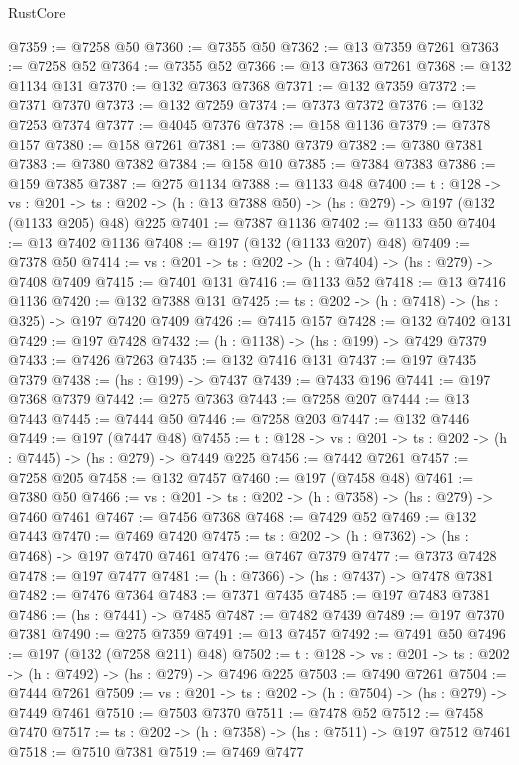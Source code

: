 \begin{lexlean}{RustCore}
\begin{coremodule}
@7359 := @7258 @50
@7360 := @7355 @50
@7362 := @13 @7359 @7261
@7363 := @7258 @52
@7364 := @7355 @52
@7366 := @13 @7363 @7261
@7368 := @132 @1134 @131
@7370 := @132 @7363 @7368
@7371 := @132 @7359
@7372 := @7371 @7370
@7373 := @132 @7259
@7374 := @7373 @7372
@7376 := @132 @7253 @7374
@7377 := @4045 @7376
@7378 := @158 @1136
@7379 := @7378 @157
@7380 := @158 @7261
@7381 := @7380 @7379
@7382 := @7380 @7381
@7383 := @7380 @7382
@7384 := @158 @10
@7385 := @7384 @7383
@7386 := @159 @7385
@7387 := @275 @1134
@7388 := @1133 @48
@7400 := {t : @128} ->
  {vs : @201} ->
  {ts : @202} -> (h : @13 @7388 @50) -> (hs : @279) -> @197 (@132 (@1133 @205) @48) @225
@7401 := @7387 @1136
@7402 := @1133 @50
@7404 := @13 @7402 @1136
@7408 := @197 (@132 (@1133 @207) @48)
@7409 := @7378 @50
@7414 := {vs : @201} -> {ts : @202} -> (h : @7404) -> (hs : @279) -> @7408 @7409
@7415 := @7401 @131
@7416 := @1133 @52
@7418 := @13 @7416 @1136
@7420 := @132 @7388 @131
@7425 := {ts : @202} -> (h : @7418) -> (hs : @325) -> @197 @7420 @7409
@7426 := @7415 @157
@7428 := @132 @7402 @131
@7429 := @197 @7428
@7432 := (h : @1138) -> (hs : @199) -> @7429 @7379
@7433 := @7426 @7263
@7435 := @132 @7416 @131
@7437 := @197 @7435 @7379
@7438 := (hs : @199) -> @7437
@7439 := @7433 @196
@7441 := @197 @7368 @7379
@7442 := @275 @7363
@7443 := @7258 @207
@7444 := @13 @7443
@7445 := @7444 @50
@7446 := @7258 @203
@7447 := @132 @7446
@7449 := @197 (@7447 @48)
@7455 := {t : @128} -> {vs : @201} -> {ts : @202} -> (h : @7445) -> (hs : @279) -> @7449 @225
@7456 := @7442 @7261
@7457 := @7258 @205
@7458 := @132 @7457
@7460 := @197 (@7458 @48)
@7461 := @7380 @50
@7466 := {vs : @201} -> {ts : @202} -> (h : @7358) -> (hs : @279) -> @7460 @7461
@7467 := @7456 @7368
@7468 := @7429 @52
@7469 := @132 @7443
@7470 := @7469 @7420
@7475 := {ts : @202} -> (h : @7362) -> (hs : @7468) -> @197 @7470 @7461
@7476 := @7467 @7379
@7477 := @7373 @7428
@7478 := @197 @7477
@7481 := (h : @7366) -> (hs : @7437) -> @7478 @7381
@7482 := @7476 @7364
@7483 := @7371 @7435
@7485 := @197 @7483 @7381
@7486 := (hs : @7441) -> @7485
@7487 := @7482 @7439
@7489 := @197 @7370 @7381
@7490 := @275 @7359
@7491 := @13 @7457
@7492 := @7491 @50
@7496 := @197 (@132 (@7258 @211) @48)
@7502 := {t : @128} -> {vs : @201} -> {ts : @202} -> (h : @7492) -> (hs : @279) -> @7496 @225
@7503 := @7490 @7261
@7504 := @7444 @7261
@7509 := {vs : @201} -> {ts : @202} -> (h : @7504) -> (hs : @279) -> @7449 @7461
@7510 := @7503 @7370
@7511 := @7478 @52
@7512 := @7458 @7470
@7517 := {ts : @202} -> (h : @7358) -> (hs : @7511) -> @197 @7512 @7461
@7518 := @7510 @7381
@7519 := @7469 @7477

\end{coremodule}
\end{lexlean}
